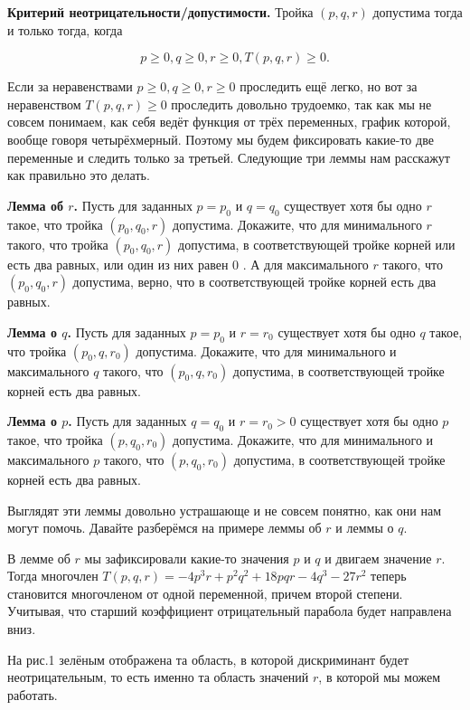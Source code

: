\textbf{Критерий неотрицательности/допустимости.}
Тройка $(p, q, r)$ допустима тогда и только тогда, когда

$$
p \geqslant 0, q \geqslant 0, r \geqslant 0, T(p, q, r) \geqslant 0 .
$$

Если за неравенствами $p \geqslant 0, q \geqslant 0, r \geqslant 0$ проследить ещё легко, но вот за неравенством $T(p,q,r)\geq0$ проследить довольно трудоемко, так как мы не совсем понимаем, как себя ведёт функция от трёх переменных, график которой, вообще говоря четырёхмерный. Поэтому мы будем фиксировать какие-то две переменные и следить только за третьей. Следующие три леммы нам расскажут как правильно это делать.


\textbf{Лемма об $r$.}
Пусть для заданных $p=p_0$ и $q=q_0$ существует хотя бы одно $r$ такое, что тройка $(p_0, q_0, r)$ допустима. Докажите, что для минимального $r$ такого, что тройка $(p_0, q_0, r)$ допустима, в соответствующей тройке корней или есть два равных, или один из них равен 0 . А для максимального $r$ такого, что $(p_0, q_0, r)$ допустима, верно, что в соответствующей тройке корней есть два равных.

\textbf{Лемма о $q$.}
Пусть для заданных $p=p_0$ и $r=r_0$ существует хотя бы одно $q$ такое, что тройка $(p_0, q, r_0)$ допустима. Докажите, что для минимального и максимального $q$ такого, что $(p_0, q, r_0)$ допустима, в соответствующей тройке корней есть два равных.

\textbf{Лемма о $p$.}
Пусть для заданных $q=q_0$ и $r=r_0>0$ существует хотя бы одно $p$ такое, что тройка $(p, q_0, r_0)$ допустима. Докажите, что для минимального и максимального $p$ такого, что $(p, q_0, r_0)$ допустима, в соответствующей тройке корней есть два равных.

Выглядят эти леммы довольно устрашающе и не совсем понятно, как они нам могут помочь. Давайте разберёмся на примере леммы об $r$ и леммы о $q$.

\newpage

\hspace{3mm}

В лемме об $r$ мы зафиксировали какие-то значения $p$ и $q$ и двигаем значение $r$. Тогда многочлен $T(p,q,r) = -4 p^3 r+p^2 q^2+18 p q r-4 q^3-27 r^2$ теперь становится многочленом от одной переменной, причем второй степени. Учитывая, что старший коэффициент отрицательный парабола будет направлена вниз.

На рис.1 зелёным отображена та область, в которой дискриминант будет неотрицательным, то есть именно та область значений $r$, в которой мы можем работать.

